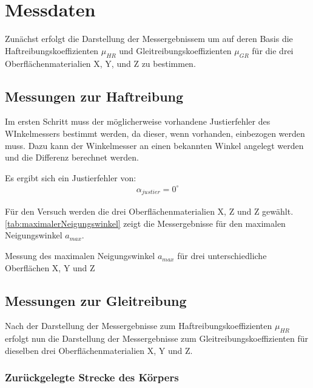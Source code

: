 \section{Messdaten}

Zunächst erfolgt die Darstellung der Messergebnissem um auf deren Basis die Haftreibungskoeffizienten $\mu_{HR}$ und Gleitreibungskoeffizienten $\mu_{GR}$ für die drei Oberflächenmaterialien X, Y, und Z zu bestimmen.

\subsection{Messungen zur Haftreibung} \label{chap:MessungHaftreibung}

Im ersten Schritt muss der möglicherweise vorhandene Justierfehler des WInkelmessers bestimmt werden, da dieser, wenn vorhanden, einbezogen werden muss. Dazu kann der Winkelmesser an einen bekannten Winkel angelegt werden und die Differenz berechnet werden. 

Es ergibt sich ein Justierfehler von:
\begin{align*}
    \alpha_{justier} = 0^\circ
\end{align*}

Für den Versuch werden die drei Oberflächenmaterialien X, Z und Z gewählt. \autoref{tab:maximalerNeigungswinkel} zeigt die Messergebnisse für den maximalen Neigungswinkel $a_{max}$.

\begin{table}[h]
    \center
    \caption[Messung des maximalen Neigungswinkel]{Messung des maximalen Neigungswinkel $a_{max}$ für drei unterschiedliche Oberflächen X, Y und Z}
    
    \label{tab:maximalerNeigungswinkel}
\end{table}

\subsection{Messungen zur Gleitreibung}

Nach der Darstellung der Messergebnisse zum Haftreibungskoeffizienten $\mu_{HR}$ erfolgt nun die Darstellung der Messergebnisse zum Gleitreibungskoeffizienten für dieselben drei Oberflächenmaterialien X, Y und Z.

\subsubsection{Zurückgelegte Strecke des Körpers}

